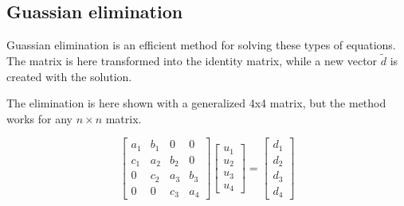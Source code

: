 \documentclass[12pt]{article}
\begin{document}
\subsection{Guassian elimination}
Guassian elimination is an efficient method for solving these types of equations. The matrix is here transformed into the identity matrix, while a new vector $\tilde{d}$ is created with the solution. 

The elimination is here shown with a generalized 4x4 matrix, but the method works for any $n\times n$ matrix. 

\begin{equation}
\begin{bmatrix}
                           a_{1}&b_{1}&0&0 \\
                           c_{1}&a_{2}&b_{2}&0\\
                           0&c_{2}&a_{3}&b_{3}\\
                           0&0&c_{3}&a_{4}
                      \end{bmatrix}
                      \begin{bmatrix}
                           u_{1} \\
                           u_{2}\\
                           u_{3}\\
                           u_{4}
                      \end{bmatrix}
                      =
                      \begin{bmatrix}
                           d_{1} \\
                           d_{2}\\
                           d_{3}\\
                           d_{4}
                      \end{bmatrix}
\end{equation}
\end{document}
